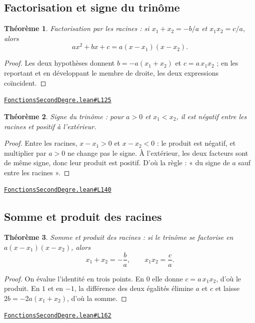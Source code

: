 \documentclass[11pt,a4paper]{article}
\theoremstyle{definition}
\theoremstyle{plain}
\newtheorem{theoreme}{Théorème}
\newcommand{\source}[2]{\par\smallskip\noindent\hfill{\footnotesize\href{#1}{\texttt{#2}}}\par\smallskip}
\begin{document}
\subsection{Factorisation et signe du trinôme}

\begin{theoreme}
Factorisation par les racines : si $x_1 + x_2 = -b/a$ et $x_1x_2 = c/a$, alors
\[ ax^2 + bx + c = a(x - x_1)(x - x_2) . \]
\end{theoreme}

\begin{proof}
Les deux hypothèses donnent $b = -a(x_1 + x_2)$ et $c = a\,x_1x_2$ ; en les reportant et
en développant le membre de droite, les deux expressions coïncident.
\end{proof}
\source{https://github.com/Commutator-IO/learn-lean/blob/main/courses/02-lycee/02-fonctions-second-degre/FonctionsSecondDegre.lean\#L125}{FonctionsSecondDegre.lean\#L125}

\begin{theoreme}
Signe du trinôme : pour $a > 0$ et $x_1 < x_2$, il est négatif entre les racines et
positif à l'extérieur.
\end{theoreme}

\begin{proof}
Entre les racines, $x - x_1 > 0$ et $x - x_2 < 0$ : le produit est négatif, et
multiplier par $a > 0$ ne change pas le signe. À l'extérieur, les deux facteurs sont de
même signe, donc leur produit est positif. D'où la règle : « du signe de $a$ sauf entre les
racines ».
\end{proof}
\source{https://github.com/Commutator-IO/learn-lean/blob/main/courses/02-lycee/02-fonctions-second-degre/FonctionsSecondDegre.lean\#L140}{FonctionsSecondDegre.lean\#L140}

\subsection{Somme et produit des racines}

\begin{theoreme}
Somme et produit des racines : si le trinôme se factorise en $a(x-x_1)(x-x_2)$, alors
\[ x_1 + x_2 = -\frac{b}{a}, \qquad x_1 x_2 = \frac{c}{a} . \]
\end{theoreme}

\begin{proof}
On évalue l'identité en trois points. En $0$ elle donne $c = a\,x_1x_2$, d'où le
produit. En $1$ et en $-1$, la différence des deux égalités élimine $a$ et $c$ et laisse
$2b = -2a(x_1 + x_2)$, d'où la somme.
\end{proof}
\source{https://github.com/Commutator-IO/learn-lean/blob/main/courses/02-lycee/02-fonctions-second-degre/FonctionsSecondDegre.lean\#L162}{FonctionsSecondDegre.lean\#L162}
\end{document}
